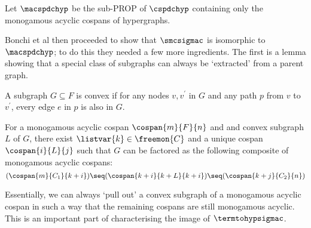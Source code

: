 \begin{definition}
    Let \(\macspdchyp\) be the sub-PROP of \(\cspdchyp\) containing only the
    monogamous acyclic cospans of hypergraphs.
\end{definition}

Bonchi et al then proceeded to show that \(\smcsigmac\) is isomorphic to
\(\macspdchyp\); to do this they needed a few more ingredients.
The first is a lemma showing that a special class of subgraphs can always be
`extracted' from a parent graph.

\begin{definition}
    A subgraph \(G \subseteq F\) is convex if for any nodes \(v, v^\prime\) in
    \(G\) and any path \(p\) from \(v\) to \(v^\prime\), every edge \(e\) in
    \(p\) is also in \(G\).
\end{definition}

\begin{lemma}
    \label{lem:decomposition}
    For a monogamous acyclic cospan \(\cospan{m}{F}{n}\) and
    and convex subgraph \(L\) of \(G\), there exist
    \(\listvar{k} \in \freemon{C}\) and a unique cospan
    \(\cospan{i}{L}{j}\) such that \(G\) can be factored as
    the following composite of monogamous acyclic cospans:
    \[
        (\cospan{m}{C_1}{k + i})
        \seq
        (\cospan{
            k + i
        }{
            k + L
        }{
            k + i
        })
        \seq
        (\cospan{k + j}{C_2}{n})
    \]
\end{lemma}

Essentially, we can always `pull out' a convex subgraph of a monogamous acyclic
cospan in such a way that the remaining cospans are still monogamous acyclic.
This is an important part of characterising the image of \(\termtohypsigmac\).

